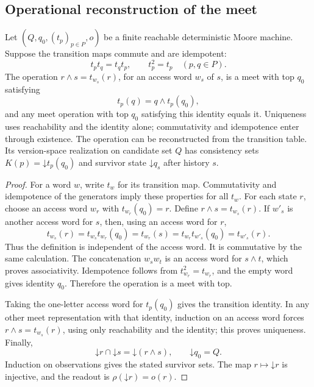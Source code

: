 \subsection{Operational reconstruction of the meet}
\begin{proposition}\label{prop:recovermeet}
Let $(Q,q_0,(t_p)_{p\in P},o)$ be a finite reachable deterministic Moore machine. Suppose the transition maps commute and are idempotent:
\[
 t_pt_q=t_qt_p,\qquad t_p^2=t_p\quad(p,q\in P).
\]
The operation $r\wedge s=t_{w_s}(r)$, for an access word $w_s$ of $s$, is a meet with top $q_0$ satisfying
\[
 t_p(q)=q\wedge t_p(q_0),
\]
and any meet operation with top $q_0$ satisfying this identity equals it. Uniqueness uses reachability and the identity alone; commutativity and idempotence enter through existence. The operation can be reconstructed from the transition table. Its version-space realization on candidate set $Q$ has consistency sets $K(p)=\mathord{\downarrow}t_p(q_0)$ and survivor state $\mathord{\downarrow}q_s$ after history $s$.
\end{proposition}
\begin{proof}
For a word $w$, write $t_w$ for its transition map. Commutativity and idempotence of the generators imply these properties for all $t_w$. For each state $r$, choose an access word $w_r$ with $t_{w_r}(q_0)=r$. Define $r\wedge s=t_{w_s}(r)$. If $w'_s$ is another access word for $s$, then, using an access word for $r$,
\[
 t_{w_s}(r)=t_{w_s}t_{w_r}(q_0)
 =t_{w_r}(s)=t_{w_r}t_{w'_s}(q_0)=t_{w'_s}(r).
\]
Thus the definition is independent of the access word. It is commutative by the same calculation. The concatenation $w_sw_t$ is an access word for $s\wedge t$, which proves associativity. Idempotence follows from $t_{w_r}^2=t_{w_r}$, and the empty word gives identity $q_0$. Therefore the operation is a meet with top.

Taking the one-letter access word for $t_p(q_0)$ gives the transition identity. In any other meet representation with that identity, induction on an access word forces $r\wedge s=t_{w_s}(r)$, using only reachability and the identity; this proves uniqueness. Finally,
\[
 \mathord{\downarrow}r\cap\mathord{\downarrow}s
 =\mathord{\downarrow}(r\wedge s),\qquad
 \mathord{\downarrow}q_0=Q.
\]
Induction on observations gives the stated survivor sets. The map $r\mapsto\mathord{\downarrow}r$ is injective, and the readout is $\rho(\mathord{\downarrow}r)=o(r)$.
\end{proof}

